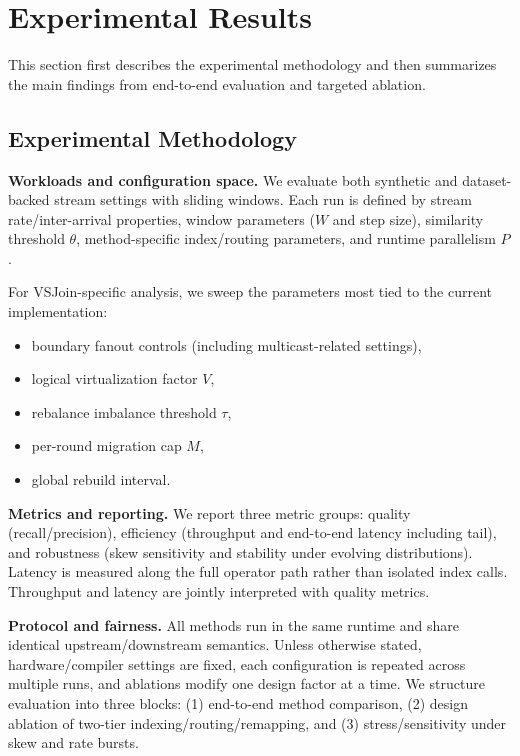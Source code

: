 \section{Experimental Results}
\label{sec:results}

This section first describes the experimental methodology and then summarizes the main findings from end-to-end evaluation and targeted ablation.

\subsection{Experimental Methodology}

\textbf{Workloads and configuration space.}
We evaluate both synthetic and dataset-backed stream settings with sliding windows. Each run is defined by stream rate/inter-arrival properties, window parameters ($W$ and step size), similarity threshold $\theta$, method-specific index/routing parameters, and runtime parallelism $P$.

For VSJoin-specific analysis, we sweep the parameters most tied to the current implementation:
\begin{itemize}
    \item boundary fanout controls (including multicast-related settings),
    \item logical virtualization factor $V$,
    \item rebalance imbalance threshold $\tau$,
    \item per-round migration cap $M$,
    \item global rebuild interval.
\end{itemize}

\textbf{Metrics and reporting.}
We report three metric groups: quality (recall/precision), efficiency (throughput and end-to-end latency including tail), and robustness (skew sensitivity and stability under evolving distributions). Latency is measured along the full operator path rather than isolated index calls. Throughput and latency are jointly interpreted with quality metrics.

\textbf{Protocol and fairness.}
All methods run in the same runtime and share identical upstream/downstream semantics. Unless otherwise stated, hardware/compiler settings are fixed, each configuration is repeated across multiple runs, and ablations modify one design factor at a time. We structure evaluation into three blocks: (1) end-to-end method comparison, (2) design ablation of two-tier indexing/routing/remapping, and (3) stress/sensitivity under skew and rate bursts.

